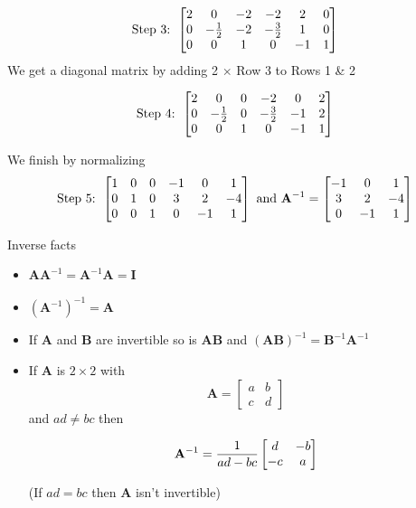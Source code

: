 \documentclass[10pt]{seminar}
\begin{document}
\begin{slide}
\newslide


$$\hbox{Step 3: }\begin{bmatrix}
2&0&-2& -2& 2& 0\\
0&-{1\over 2}&-2& -{3\over 2}&1 & 0\\
0&0&1& 0& -1&1
\end{bmatrix}$$
We get a diagonal matrix by adding 2 $\times $ Row 3 to Rows 1 \& 2  

$$\hbox{Step 4: }\begin{bmatrix}
2&0&0& -2& 0& 2\\
0&-{1\over 2}&0& -{3\over 2}&-1 & 2\\
0&0&1& 0& -1&1
\end{bmatrix}$$

We finish by normalizing
$$\hbox{Step 5: }\begin{bmatrix}
1&0&0& -1& 0& 1\\
0&1&0&3&2 & -4\\
0&0&1& 0& -1&1
\end{bmatrix}
\hbox{ and } \mathbf{A}^{-1}=
\begin{bmatrix}
 -1& 0& 1\\
3&2 & -4\\
 0& -1&1
\end{bmatrix}
$$

\newslide

Inverse facts
\begin{itemize}
\item $\mathbf{A}\mathbf{A}^{-1}=\mathbf{A}^{-1}\mathbf{A}=\mathbf{I}$
\item $(\mathbf{A}^{-1})^{-1}=\mathbf{A}$
\item If $\mathbf{A}$ and $\mathbf{B}$ are invertible so is $\mathbf{A}\mathbf{B}$ and $(\mathbf{AB})^{-1}=\mathbf{B}^{-1}\mathbf{A}^{-1}$
\item If $\mathbf{A}$ is $2 \times 2$ with $$\mathbf{A}=\begin{bmatrix}
a&b\\c&d
\end{bmatrix}$$  and $ad\not=bc$ then 

$$\mathbf{A}^{-1}={1\over{ad-bc}}\begin{bmatrix}
d&-b\\-c&a
\end{bmatrix}$$

(If $ad=bc$ then $\mathbf{A}$ isn't invertible)
\end{itemize}


 \end{slide}
 
 
\end{document}
